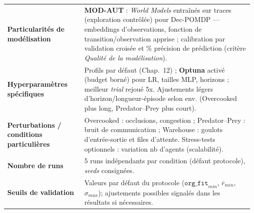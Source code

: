 \begin{table}[h!]
{\begin{tabular}{p{5cm}p{8.5cm}}
      \textbf{Particularités de modélisation}           & \textbf{MOD-AUT} : \textit{World Models} entraînés sur traces (exploration contrôlée) pour Dec-POMDP — embeddings d’observations, fonction de transition/observation apprise ; calibration par validation croisée et \% précision de prédiction (critère \emph{Qualité de la modélisation}).                                                                                                                                                                           \\

      \textbf{Hyperparamètres spécifiques}              & Profils par défaut (Chap.~12) ; \textbf{Optuna} activé (budget borné) pour LR, tailles MLP, horizons ; meilleur \emph{trial} rejoué 5x. Ajustements légers d’horizon/longueur-épisode selon env. (Overcooked plus long, Predator–Prey plus court).                                                                                                                                                                                                                     \\

      \textbf{Perturbations / conditions particulières} & Overcooked : occlusions, congestion ; Predator–Prey : bruit de communication ; Warehouse : goulots d’entrée-sortie et files d’attente. Stress-tests optionnels : variation nb d’agents (scalabilité).                                                                                                                                                                                                                                                                  \\

      \textbf{Nombre de runs}                           & 5 runs indépendants par condition (défaut protocole), \emph{seeds} consignées.                                                                                                                                                                                                                                                                                                                                                                                         \\

      \textbf{Seuils de validation}                     & Valeurs par défaut du protocole (\(\texttt{org\_fit}_{min}\), \(\overline{r}_{min}\), \(\sigma_{max}\)); ajustements possibles signalés dans les résultats si nécessaires.                                                                                                                                                                                                                                                                                             \\
      \hline
    \end{tabular}
  }
\end{table}

